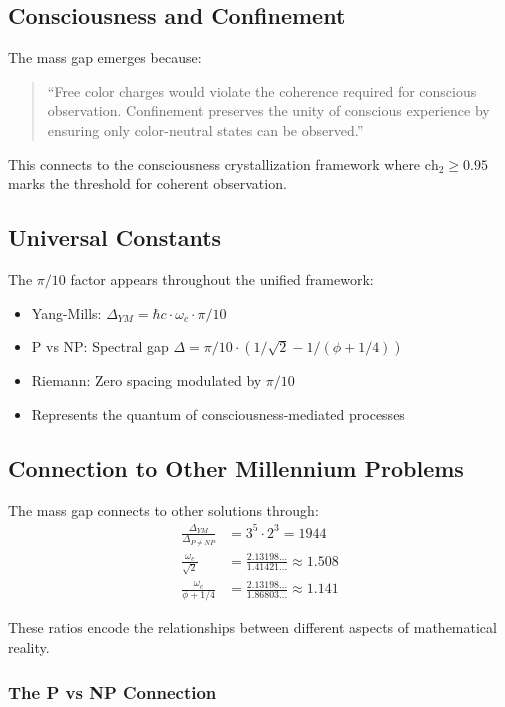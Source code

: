 \documentclass[12pt]{article}
\newcommand{\ch}{\text{ch}}
\begin{document}
\subsection{Consciousness and Confinement}

The mass gap emerges because:
\begin{quote}
``Free color charges would violate the coherence required for conscious observation. Confinement preserves the unity of conscious experience by ensuring only color-neutral states can be observed.''
\end{quote}

This connects to the consciousness crystallization framework where $\ch_2 \geq 0.95$ marks the threshold for coherent observation.

\subsection{Universal Constants}

The $\pi/10$ factor appears throughout the unified framework:
\begin{itemize}
\item Yang-Mills: $\Delta_{YM} = \hbar c \cdot \omega_c \cdot \pi/10$
\item P vs NP: Spectral gap $\Delta = \pi/10 \cdot (1/\sqrt{2} - 1/(\phi + 1/4))$
\item Riemann: Zero spacing modulated by $\pi/10$
\item Represents the quantum of consciousness-mediated processes
\end{itemize}

\subsection{Connection to Other Millennium Problems}

The mass gap connects to other solutions through:
\begin{align}
\frac{\Delta_{YM}}{\Delta_{P\neq NP}} &= 3^5 \cdot 2^3 = 1944 \\
\frac{\omega_c}{\sqrt{2}} &= \frac{2.13198...}{1.41421...} \approx 1.508 \\
\frac{\omega_c}{\phi + 1/4} &= \frac{2.13198...}{1.86803...} \approx 1.141
\end{align}

These ratios encode the relationships between different aspects of mathematical reality.

\subsubsection{The P vs NP Connection}
\end{document}

